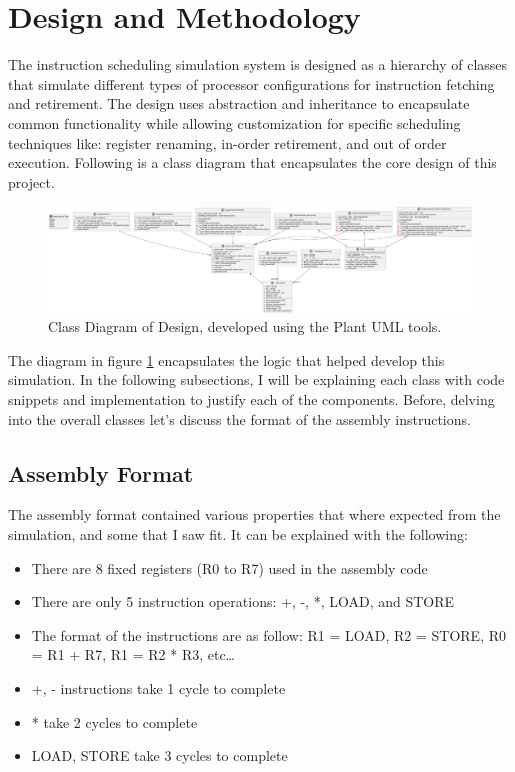 \documentclass{article}
\begin{document}
\section{Design and Methodology}
The instruction scheduling simulation system is designed as a hierarchy of classes that simulate different types of processor configurations for instruction fetching and retirement. The design uses abstraction and inheritance to encapsulate common functionality while allowing customization for specific scheduling techniques like: register renaming, in-order retirement, and out of order execution. Following is a class diagram that encapsulates the core design of this project.

\begin{figure}[H]
    \centering
    \includegraphics[width=1\textwidth]{ClassDiagram.png}  
    \caption{Class Diagram of Design, developed using the Plant UML tools.}  
    \label{fig:ClassDiagram}
\end{figure}

The diagram in figure \ref{fig:ClassDiagram} encapsulates the logic that helped develop this simulation. In the following subsections, I will be explaining each class with code snippets and implementation to justify each of the components. Before, delving into the overall classes let's discuss the format of the assembly instructions. 

\subsection{Assembly Format}
The assembly format contained various properties that where expected from the simulation, and some that I saw fit. It can be explained with the following:

\begin{itemize}
    \item There are 8 fixed registers (R0 to R7) used in the assembly code
    \item There are only 5 instruction operations: +, -, *, LOAD, and STORE
    \item The format of the instructions are as follow: R1 = LOAD, R2 = STORE, R0 = R1 + R7, R1 = R2 * R3, etc\ldots
    \item +, - instructions take 1 cycle to complete
    \item * take 2 cycles to complete 
    \item LOAD, STORE take 3 cycles to complete
\end{itemize}
\end{document}
